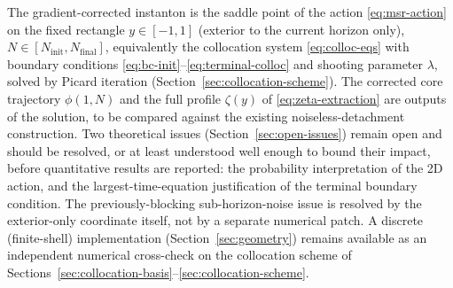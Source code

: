 \documentclass[a4paper,11pt]{article}
\newcommand{\Ny}{N}                          %
\newcommand{\Ninit}{N_{\mathrm{init}}}       %
\newcommand{\Nfinal}{N_{\mathrm{final}}}     %
\newcommand{\field}{\phi}                    %
\newcommand{\yco}{y}                         %
\newcommand{\lag}{\lambda}                   %
\newcommand{\zprofile}{\zeta}                %
\begin{document}
The gradient-corrected instanton is the saddle point of the action
\eqref{eq:msr-action} on the fixed rectangle $\yco\in[-1,1]$
(exterior to the current horizon only), $\Ny\in[\Ninit,\Nfinal]$,
equivalently the collocation system \eqref{eq:colloc-eqs} with boundary
conditions \eqref{eq:bc-init}--\eqref{eq:terminal-colloc} and shooting
parameter $\lag$, solved by Picard iteration
(Section~\ref{sec:collocation-scheme}). The corrected core trajectory
$\field(1,\Ny)$ and the full profile $\zprofile(\yco)$ of
\eqref{eq:zeta-extraction} are outputs of the solution, to be compared
against the existing noiseless-detachment construction. Two theoretical
issues (Section~\ref{sec:open-issues}) remain open and should be resolved,
or at least understood well enough to bound their impact, before
quantitative results are reported: the probability interpretation of the
2D action, and the largest-time-equation justification of the terminal
boundary condition. The previously-blocking sub-horizon-noise issue is
resolved by the exterior-only coordinate itself, not by a separate
numerical patch. A discrete (finite-shell) implementation
(Section~\ref{sec:geometry}) remains available as an independent numerical
cross-check on the collocation scheme of
Sections~\ref{sec:collocation-basis}--\ref{sec:collocation-scheme}.
\end{document}

